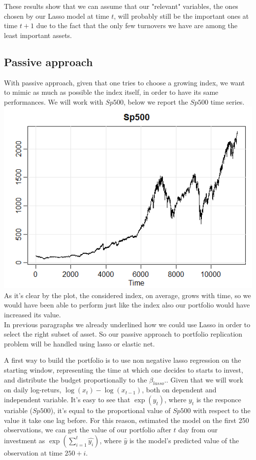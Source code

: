\documentclass{article}%
\begin{document}
These results show that we can assume that our "relevant" variables, the ones chosen by our Lasso model at time $t$, will probably still be the important ones at time $t+1$ due to the fact that the only few turnovers we have are among the least important assets.


\subsection{Passive approach}

With passive approach, given that one tries to choose a growing index, we want to mimic as much as possible the index itself, in order to have its same performances.
We will work with $Sp500$, below we report the $Sp500$ time series.
\\


\includegraphics[scale=0.75]{sp500}
\\
		
As it's clear by the plot, the considered index, on average, grows with time, so we would have been able to perform just like the index also our portfolio would have increased its value.
\\

In previous paragraphs we already underlined how we could use Lasso in order to select the right subset of asset. So our passive approach to portfolio replication problem will be handled using lasso or elastic net.

A first way to build the portfolio is to use non negative lasso regression on the starting window, representing the time at which one decides to starts to invest, and distribute the budget proportionally to the $\beta_{lasso}$.. Given that we will work on daily log-returs, $\log(x_t)-\log(x_{t-1})$, both on dependent and independent variable. It's easy to see that $\exp(y_t)$, where $y_t$ is the responce variable ($Sp500$), it's equal to the proportional value of $Sp500$ with respect to the value it take one lag before. For this reason, estimated the model on the first 250 observations, we can get the value of our portfolio after $t$ day from our investment as $\exp(\sum_{i=1}^t \hat{y_i})$, where $\hat{y}$ is the model's predicted value of the observation at time $250+i$.
\end{document}
